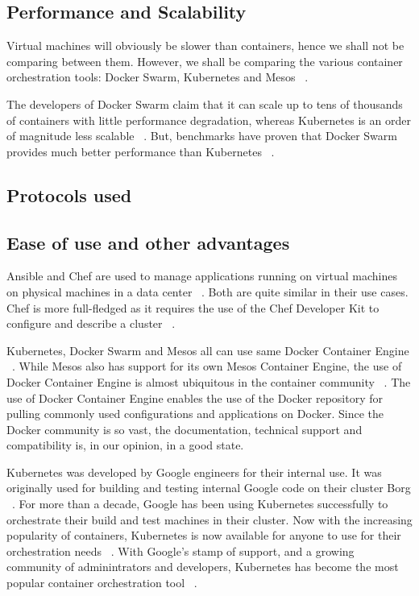 \documentclass[10pt,twocolumn]{article}
\begin{document}
\subsection{Performance and Scalability}

Virtual machines will obviously be slower than containers, hence we shall not be comparing between them.
However, we shall be comparing the various container orchestration tools: Docker Swarm, Kubernetes and Mesos ~\cite{docker_swarm, kubernetes, mesos}.

The developers of Docker Swarm claim that it can scale up to tens of thousands of containers with little performance degradation, whereas Kubernetes is an order of magnitude less scalable ~\cite{docker_swarm}.
But, benchmarks have proven that Docker Swarm provides much better performance than Kubernetes ~\cite{dockerswarm_vs_kubernetes}.

\subsection{Protocols used}



\subsection{Ease of use and other advantages}

Ansible and Chef are used to manage applications running on virtual machines on physical machines in a data center ~\cite{ansible, chef}.
Both are quite similar in their use cases.
Chef is more full-fledged as it requires the use of the Chef Developer Kit to configure and describe a cluster ~\cite{chef}.

Kubernetes, Docker Swarm and Mesos all can use same Docker Container Engine ~\cite{kubernets, docker_swarm, mesos}.
While Mesos also has support for its own Mesos Container Engine, the use of Docker Container Engine is almost ubiquitous in the container community ~\cite{intro_docker}.
The use of Docker Container Engine enables the use of the Docker repository for pulling commonly used configurations and applications on Docker.
Since the Docker community is so vast, the documentation, technical support and compatibility is, in our opinion, in a good state.

Kubernetes was developed by Google engineers for their internal use.
It was originally used for building and testing internal Google code on their cluster Borg ~\cite{kubernetes, borg}.
For more than a decade, Google has been using Kubernetes successfully to orchestrate their build and test machines in their cluster.
Now with the increasing popularity of containers, Kubernetes is now available for anyone to use for their orchestration needs ~\cite{kubernetes_github}.
With Google's stamp of support, and a growing community of adminintrators and developers, Kubernetes has become the most popular container orchestration tool ~\cite{openhub}.
\end{document}

